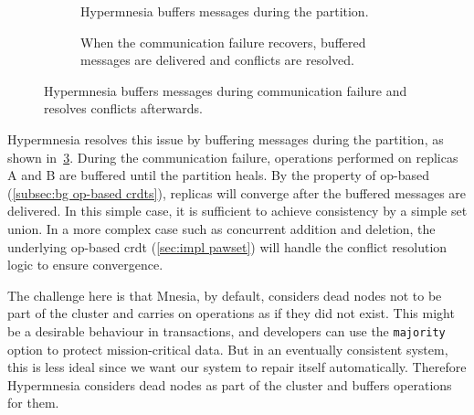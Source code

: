 \begin{figure}[htp]
\begin{subfigure}[t]{0.9\columnwidth}
    \caption{Hypermnesia buffers messages during the partition.}
    \label{subfig:hypermnesia comm failure b}
  \end{subfigure}

  \begin{subfigure}[t]{0.9\columnwidth}
    \centering
    \caption{When the communication failure recovers, buffered messages are delivered
    and conflicts are resolved.}
    \label{fig:hypermnesia comm failure}
  \end{subfigure}
  \caption{Hypermnesia buffers messages during communication failure and resolves
  conflicts afterwards.}
\end{figure}


Hypermnesia resolves this issue by buffering messages during the partition, as
shown in~\cref{fig:hypermnesia comm failure}. During the communication failure, 
operations performed on replicas A and B are buffered until the partition heals. 
By the property of op-based  (\cref{subsec:bg op-based crdts}),
replicas will converge after the buffered messages are delivered.
In this simple case, it is sufficient to achieve consistency by a simple set 
union. In a more complex case
such as concurrent addition and deletion, the underlying op-based 
\acrshort{crdt} (\cref{sec:impl pawset}) will handle the conflict resolution 
logic to ensure convergence.

The challenge here is that Mnesia, by default, considers dead nodes not to be 
part of the
cluster and carries on operations as if they did not exist. This might be a
desirable behaviour in transactions, and developers can use the \texttt{majority}
option to protect mission-critical data. But in an eventually consistent system,
this is less ideal since we want our system to repair itself automatically.
Therefore Hypermnesia considers dead nodes as part of the cluster and buffers
operations for them.

